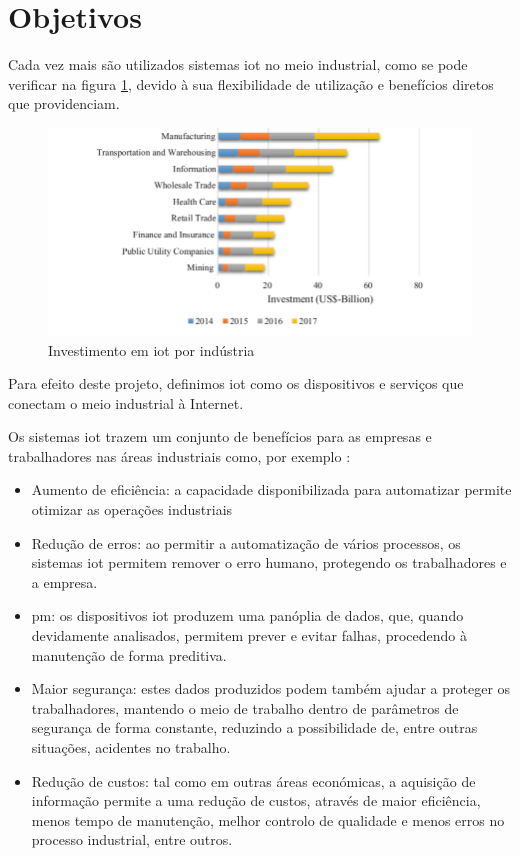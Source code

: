 
\section{Objetivos}

Cada vez mais são utilizados sistemas \acrfull{iot} no meio industrial, como se pode verificar na figura \ref{fig:investment}, devido à sua flexibilidade de utilização e benefícios diretos que providenciam. 

\begin{figure}[ht]
	\includegraphics[width=\textwidth]{images/investments-in-IoT-solutions-by-industry.png}
	\caption{Investimento em \acrshort{iot} por indústria \parencite{cyberind4}}
	\label{fig:investment}
	\centering
\end{figure}

Para efeito deste projeto, definimos \acrshort{iot} como os dispositivos e serviços que conectam o meio industrial à Internet.

Os sistemas \acrshort{iot} trazem um conjunto de benefícios para as empresas e trabalhadores nas áreas industriais como, por exemplo \parencite{mendoza}:

\begin{itemize}
	\item Aumento de eficiência: a capacidade disponibilizada para automatizar permite otimizar as operações industriais
	\item Redução de erros: ao permitir a automatização de vários processos, os sistemas \acrshort{iot} permitem remover o erro humano, protegendo os trabalhadores e a empresa.
	\item \acrfull{pm}: os dispositivos \acrshort{iot} produzem uma panóplia de dados, que, quando devidamente analisados, permitem prever e evitar falhas, procedendo à manutenção de forma preditiva.
	\item Maior segurança: estes dados produzidos podem também ajudar a proteger os trabalhadores, mantendo o meio de trabalho dentro de parâmetros de segurança de forma constante, reduzindo a possibilidade de, entre outras situações, acidentes no trabalho.
	\item Redução de custos: tal como em outras áreas económicas, a aquisição de informação permite a uma redução de custos, através de maior eficiência, menos tempo de manutenção, melhor controlo de qualidade e menos erros no processo industrial, entre outros.
\end{itemize}

